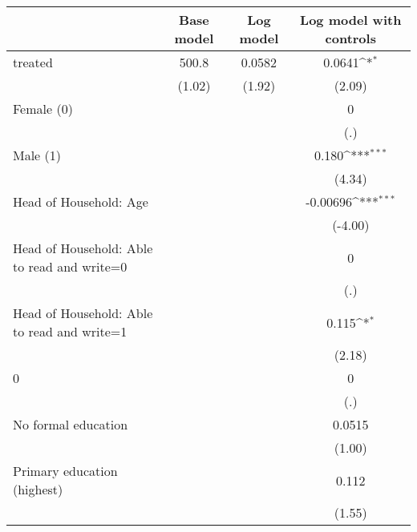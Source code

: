 {
\def\sym#1{\ifmmode^{#1}\else\(^{#1}\)\fi}
\begin{tabular}{l*{3}{c}}
\hline\hline
                    &\multicolumn{1}{c}{Base model}&\multicolumn{1}{c}{Log model}&\multicolumn{1}{c}{Log model with controls}\\
\hline
treated             &       500.8         &      0.0582         &      0.0641\sym{*}  \\
                    &      (1.02)         &      (1.92)         &      (2.09)         \\
[1em]
Female (0)          &                     &                     &           0         \\
                    &                     &                     &         (.)         \\
[1em]
Male (1)            &                     &                     &       0.180\sym{***}\\
                    &                     &                     &      (4.34)         \\
[1em]
Head of Household: Age&                     &                     &    -0.00696\sym{***}\\
                    &                     &                     &     (-4.00)         \\
[1em]
Head of Household: Able to read and write=0&                     &                     &           0         \\
                    &                     &                     &         (.)         \\
[1em]
Head of Household: Able to read and write=1&                     &                     &       0.115\sym{*}  \\
                    &                     &                     &      (2.18)         \\
[1em]
0                   &                     &                     &           0         \\
                    &                     &                     &         (.)         \\
[1em]
No formal education &                     &                     &      0.0515         \\
                    &                     &                     &      (1.00)         \\
[1em]
Primary education (highest)&                     &                     &       0.112         \\
                    &                     &                     &      (1.55)         \\

\end{tabular}}
